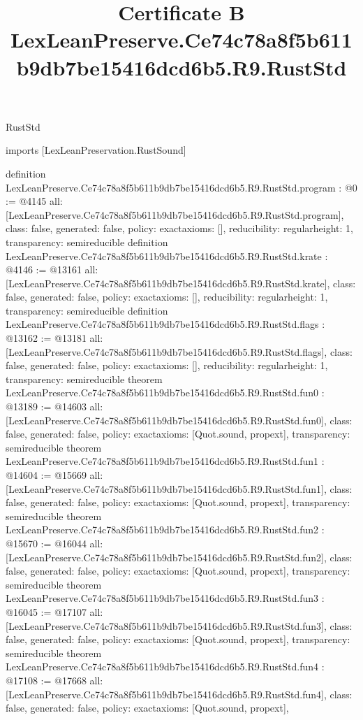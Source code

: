 \begin{lexlean}{RustStd}
\title{Certificate B LexLeanPreserve.Ce74c78a8f5b611b9db7be15416dcd6b5.R9.RustStd}
\begin{coremodule}
imports [LexLeanPreservation.RustSound]

definition LexLeanPreserve.Ce74c78a8f5b611b9db7be15416dcd6b5.R9.RustStd.program : @0 := @4145 {
  all: [LexLeanPreserve.Ce74c78a8f5b611b9db7be15416dcd6b5.R9.RustStd.program],
  class: false,
  generated: false,
  policy: exact{axioms: []},
  reducibility: regular{height: 1},
  transparency: semireducible
}
definition LexLeanPreserve.Ce74c78a8f5b611b9db7be15416dcd6b5.R9.RustStd.krate : @4146 := @13161 {
  all: [LexLeanPreserve.Ce74c78a8f5b611b9db7be15416dcd6b5.R9.RustStd.krate],
  class: false,
  generated: false,
  policy: exact{axioms: []},
  reducibility: regular{height: 1},
  transparency: semireducible
}
definition LexLeanPreserve.Ce74c78a8f5b611b9db7be15416dcd6b5.R9.RustStd.flags : @13162 := @13181 {
  all: [LexLeanPreserve.Ce74c78a8f5b611b9db7be15416dcd6b5.R9.RustStd.flags],
  class: false,
  generated: false,
  policy: exact{axioms: []},
  reducibility: regular{height: 1},
  transparency: semireducible
}
theorem LexLeanPreserve.Ce74c78a8f5b611b9db7be15416dcd6b5.R9.RustStd.fun0 : @13189 := @14603 {
  all: [LexLeanPreserve.Ce74c78a8f5b611b9db7be15416dcd6b5.R9.RustStd.fun0],
  class: false,
  generated: false,
  policy: exact{axioms: [Quot.sound, propext]},
  transparency: semireducible
}
theorem LexLeanPreserve.Ce74c78a8f5b611b9db7be15416dcd6b5.R9.RustStd.fun1 : @14604 := @15669 {
  all: [LexLeanPreserve.Ce74c78a8f5b611b9db7be15416dcd6b5.R9.RustStd.fun1],
  class: false,
  generated: false,
  policy: exact{axioms: [Quot.sound, propext]},
  transparency: semireducible
}
theorem LexLeanPreserve.Ce74c78a8f5b611b9db7be15416dcd6b5.R9.RustStd.fun2 : @15670 := @16044 {
  all: [LexLeanPreserve.Ce74c78a8f5b611b9db7be15416dcd6b5.R9.RustStd.fun2],
  class: false,
  generated: false,
  policy: exact{axioms: [Quot.sound, propext]},
  transparency: semireducible
}
theorem LexLeanPreserve.Ce74c78a8f5b611b9db7be15416dcd6b5.R9.RustStd.fun3 : @16045 := @17107 {
  all: [LexLeanPreserve.Ce74c78a8f5b611b9db7be15416dcd6b5.R9.RustStd.fun3],
  class: false,
  generated: false,
  policy: exact{axioms: [Quot.sound, propext]},
  transparency: semireducible
}
theorem LexLeanPreserve.Ce74c78a8f5b611b9db7be15416dcd6b5.R9.RustStd.fun4 : @17108 := @17668 {
  all: [LexLeanPreserve.Ce74c78a8f5b611b9db7be15416dcd6b5.R9.RustStd.fun4],
  class: false,
  generated: false,
  policy: exact{axioms: [Quot.sound, propext]},
}
\end{coremodule}
\end{lexlean}
